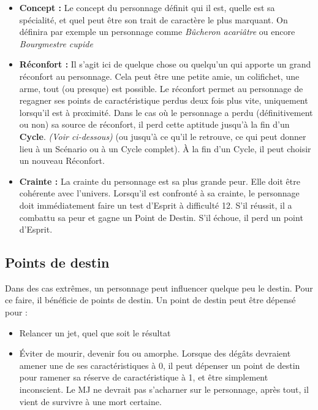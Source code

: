 \documentclass[twoside,12pt,english]{book}
\begin{document}
\begin{itemize}
	\item \textbf{Concept :} Le concept du personnage définit qui il est, quelle est sa spécialité, et quel peut être son trait de caractère le plus marquant. On définira par exemple un personnage comme \emph{Bûcheron acariâtre} ou encore \emph{Bourgmestre cupide}
	\item \textbf{Réconfort :} Il s'agit ici de quelque chose ou quelqu'un qui apporte un grand réconfort au personnage. Cela peut être une petite amie, un colifichet, une arme, tout (ou presque) est possible. Le réconfort permet au personnage de regagner ses points de caractéristique perdus deux fois plus vite, uniquement lorsqu'il est à proximité. Dans le cas où le personnage a perdu (définitivement ou non) sa source de réconfort, il perd cette aptitude jusqu'à la fin d'un \textbf{Cycle}. \emph{(Voir ci-dessous)} (ou jusqu'à ce qu'il le retrouve, ce qui peut donner lieu à un Scénario ou à un Cycle complet). À la fin d'un Cycle, il peut choisir un nouveau Réconfort.
	\item \textbf{Crainte :} La crainte du personnage est sa plus grande peur. Elle doit être cohérente avec l'univers. Lorsqu'il est confronté à sa crainte, le personnage doit immédiatement faire un test d'Esprit à difficulté 12. S'il réussit, il a combattu sa peur et gagne un Point de Destin. S'il échoue, il perd un point d'Esprit.
\end{itemize}

\subsection{Points de destin}

Dans des cas extrêmes, un personnage peut influencer quelque peu le destin. Pour ce faire, il bénéficie de points de destin. Un point de destin peut être dépensé pour :

\begin{itemize}
	\item Relancer un jet, quel que soit le résultat
	\item Éviter de mourir, devenir fou ou amorphe. Lorsque des dégâts devraient amener une de ses caractéristiques à 0, il peut dépenser un point de destin pour ramener sa réserve de caractéristique à 1, et être simplement inconscient. Le MJ ne devrait pas s'acharner sur le personnage, après tout, il vient de survivre à une mort certaine.
\end{itemize}
\end{document}
